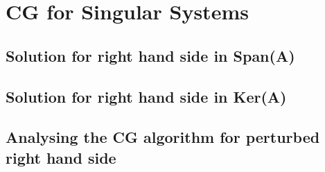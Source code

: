 \chapter{CG for Singular Systems}

\section{Solution for right hand side in Span(A)}

\section{Solution for right hand side in Ker(A)}

\section{Analysing the CG algorithm for perturbed right hand side}
